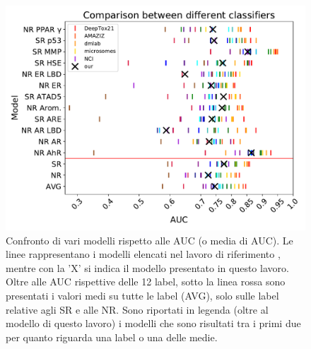 \begin{figure}
	\centering
	\includegraphics[width=0.9\linewidth]{../images/pdf/comparison}
	\caption{Confronto di vari modelli rispetto alle AUC (o media di AUC). Le linee rappresentano i modelli elencati nel lavoro di riferimento \cite{mayr2016deeptox}, mentre con la 'X' si indica il modello presentato in questo lavoro. Oltre alle AUC rispettive delle 12 label, sotto la linea rossa sono presentati i valori medi su tutte le label (AVG), solo sulle label relative agli SR e alle NR. Sono riportati in legenda (oltre al modello di questo lavoro) i modelli che sono risultati tra i primi due per quanto riguarda una label o una delle medie.}
	\label{fig:comparison}
\end{figure}



